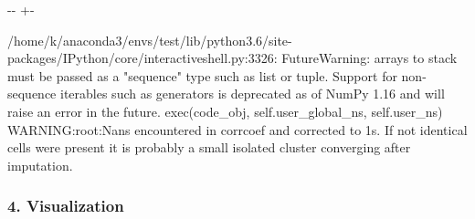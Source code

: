 \documentclass[letterpaper,10pt,english]{sphinxmanual}
\newlength\nbsphinxcodecellspacing
\begin{document}
{

\kern-\sphinxverbatimsmallskipamount\kern-\baselineskip
\kern+\FrameHeightAdjust\kern-\fboxrule
\vspace{\nbsphinxcodecellspacing}

\begin{sphinxVerbatim}[commandchars=\\\{\}]
/home/k/anaconda3/envs/test/lib/python3.6/site-packages/IPython/core/interactiveshell.py:3326: FutureWarning: arrays to stack must be passed as a "sequence" type such as list or tuple. Support for non-sequence iterables such as generators is deprecated as of NumPy 1.16 and will raise an error in the future.
  exec(code\_obj, self.user\_global\_ns, self.user\_ns)
WARNING:root:Nans encountered in corrcoef and corrected to 1s. If not identical cells were present it is probably a small isolated cluster converging after imputation.
\end{sphinxVerbatim}
}


\subsubsection{4. Visualization}
\label{\detokenize{notebooks/05_simulation/Gata1_KO_simulation_with_Paul_etal_2015_data:4.-Visualization}}
\end{document}
